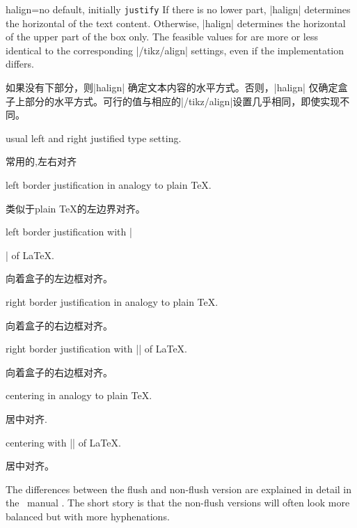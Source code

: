 \begin{docTcbKey}[][doc new=2015-05-07]{halign}{=}{no default, initially \texttt{justify}}
If there is no lower part, |halign| determines the horizontal 
of the text content.
Otherwise, |halign| determines the horizontal 
of the upper part of the box only.
The feasible values for  are more or less identical to
the corresponding |/tikz/align| settings, even if the implementation differs.

如果没有下部分，则|halign| 确定文本内容的水平方式。否则，|halign| 仅确定盒子上部分的水平方式。可行的值与相应的|/tikz/align|设置几乎相同，即使实现不同。

\begin{DescriptionR}{}
\item[\docValue{justify}] usual left and right justified type setting.
\par 常用的,左右对齐%
\item[\docValue{left}]left border justification in analogy to plain \TeX.
\par 类似于plain \TeX 的左边界对齐。
\item[\docValue{flush left}]
left border justification with |\raggedright| of \LaTeX.
\par 向着盒子的左边框对齐。%
\item[\docValue{right}]right border justification in analogy to plain \TeX.
\par 向着盒子的右边框对齐。%
\item[\docValue{flush right}]right border justification with |\raggedleft| of \LaTeX.
\par 向着盒子的右边框对齐。%
\item[\docValue{center}]centering in analogy to plain \TeX.
\par 居中对齐.%
\item[\docValue{flush center}]centering with |\centering| of \LaTeX.
\par 居中对齐。%
\end{DescriptionR}
The differences between the flush and non-flush version are explained in
detail in the \tikzname\ manual \cite{tantau:tikz_and_pgf}. The short story is that
the non-flush versions will often look more balanced but with more
hyphenations.


\end{docTcbKey}

